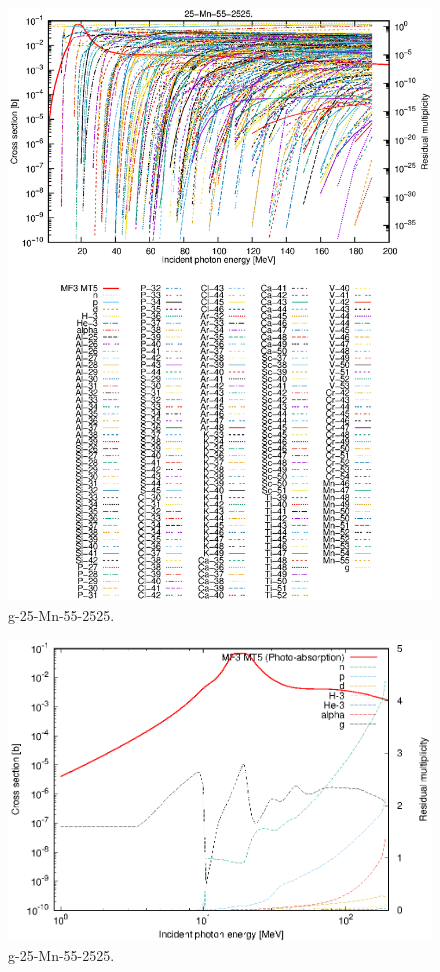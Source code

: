 \begin{figure}
 \includegraphics[width=\linewidth]{eps/g_25-Mn-55_2525.eps}
  \caption{g-25-Mn-55-2525.}
\end{figure}
\newpage \clearpage

\begin{figure}
 \includegraphics[width=\linewidth]{eps-log/g_25-Mn-55_2525.eps}
 \caption{g-25-Mn-55-2525.}
\end{figure}
\newpage \clearpage

